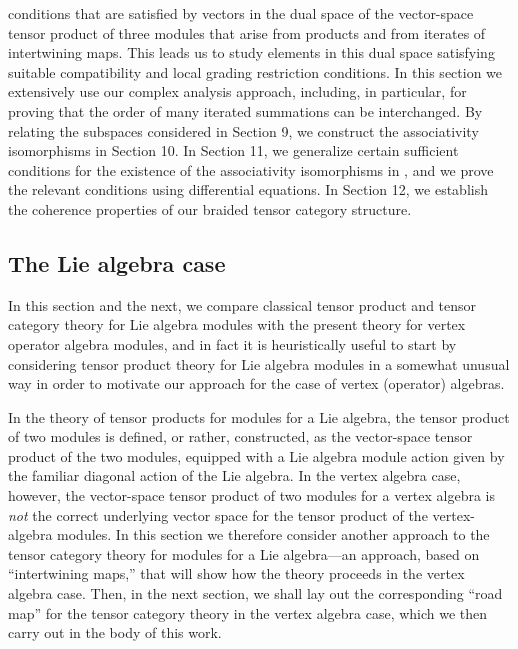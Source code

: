 \documentclass[12pt]{article}
\begin{document}
conditions that are satisfied by vectors in the dual space of the
vector-space tensor product of three modules that arise {}from
products and {}from iterates of intertwining maps.  This leads us to
study elements in this dual space satisfying suitable compatibility
and local grading restriction conditions.  In this section we
extensively use our complex analysis approach, including, in
particular, for proving that the order of many iterated summations can
be interchanged.  By relating the subspaces considered in Section 9,
we construct the associativity isomorphisms in Section 10.  In Section
11, we generalize certain sufficient conditions for the existence of
the associativity isomorphisms in \cite{tensor4}, and we prove the
relevant conditions using differential equations.  In Section 12, we
establish the coherence properties of our braided tensor category
structure.

\subsection{The Lie algebra case}\label{LA}

In this section and the next, we compare classical tensor product and
tensor category theory for Lie algebra modules with the present theory
for vertex operator algebra modules, and in fact it is heuristically
useful to start by considering tensor product theory for Lie algebra
modules in a somewhat unusual way in order to motivate our approach
for the case of vertex (operator) algebras.

In the theory of tensor products for modules for a Lie algebra, the
tensor product of two modules is defined, or rather, constructed, as
the vector-space tensor product of the two modules, equipped with a
Lie algebra module action given by the familiar diagonal action of the
Lie algebra.  In the vertex algebra case, however, the vector-space
tensor product of two modules for a vertex algebra is {\it not} the
correct underlying vector space for the tensor product of the
vertex-algebra modules.  In this section we therefore consider
another approach to the tensor category theory for modules for a Lie
algebra---an approach, based on ``intertwining maps,'' that will show
how the theory proceeds in the vertex algebra case.  Then, in the next
section, we shall lay out the corresponding ``road map'' for the
tensor category theory in the vertex algebra case, which we then carry
out in the body of this work.
\end{document}
